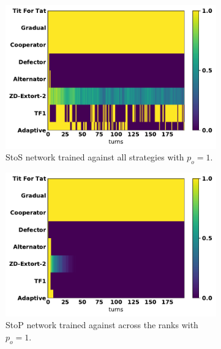\begin{figure}[!htbp]
    \begin{subfigure}{.32\textwidth}
        \includegraphics[width=\textwidth]{src/chapters/07/img/s_t_s_against_seven_opponents.pdf}
        \caption{StoS network trained
        against all strategies with $p_o=1$.}
    \end{subfigure}\hfill
\begin{subfigure}{.32\textwidth}
        \includegraphics[width=\textwidth]{src/chapters/07/img/s_t_p_twenty_against_seven_opponents.pdf}
        \caption{StoP network trained
        against across the ranks with $p_o=1$.}
    \end{subfigure}\hfill
    \begin{subfigure}{.32\textwidth}

\end{subfigure}
\end{figure}
